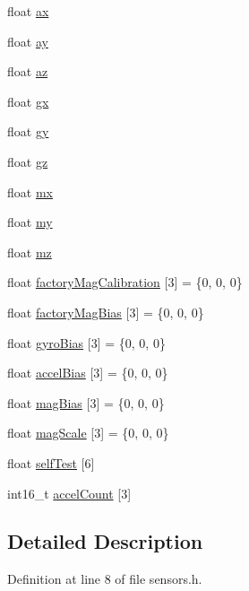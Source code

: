 \begin{DoxyCompactItemize}
float \hyperlink{classMPU9250_aea8a7622821bf8aca55fcef71d91e29f}{ax}
\item 
float \hyperlink{classMPU9250_a5129e95dbe12544fa34cc53b5644ff71}{ay}
\item 
float \hyperlink{classMPU9250_a8ab7a335476e40a26aba80f867ac7da9}{az}
\item 
float \hyperlink{classMPU9250_a59b6d7bd37738bac258da24ad330feef}{gx}
\item 
float \hyperlink{classMPU9250_a126311c382d2667b7bc7cbe1f9b38b51}{gy}
\item 
float \hyperlink{classMPU9250_a756658ca06a3807ef426ab87022a15c9}{gz}
\item 
float \hyperlink{classMPU9250_aa4cc8b2c9417304d1106bdbd988ac607}{mx}
\item 
float \hyperlink{classMPU9250_ad7cf9fe3134d24f46705881b2e002f31}{my}
\item 
float \hyperlink{classMPU9250_af11072922aa71ffb125fe3786f848653}{mz}
\item 
float \hyperlink{classMPU9250_a30d462461868e4f306c2f47d1adbd1d2}{factory\+Mag\+Calibration} \mbox{[}3\mbox{]} = \{0, 0, 0\}
\item 
float \hyperlink{classMPU9250_af34938d098b83ec910bee1b51a41972f}{factory\+Mag\+Bias} \mbox{[}3\mbox{]} = \{0, 0, 0\}
\item 
float \hyperlink{classMPU9250_a4fc2232b3fdbd61bc1024c86842ddf9a}{gyro\+Bias} \mbox{[}3\mbox{]} = \{0, 0, 0\}
\item 
float \hyperlink{classMPU9250_a7b0e6389baccd5592c95cae9d24d1317}{accel\+Bias} \mbox{[}3\mbox{]} = \{0, 0, 0\}
\item 
float \hyperlink{classMPU9250_a1f3b364d6efca22837dd944c60effce5}{mag\+Bias} \mbox{[}3\mbox{]} = \{0, 0, 0\}
\item 
float \hyperlink{classMPU9250_a09f641aa48a5c7228a6ea5034e0391c3}{mag\+Scale} \mbox{[}3\mbox{]} = \{0, 0, 0\}
\item 
float \hyperlink{classMPU9250_afd15093e18fc34ce15e526f464fc557a}{self\+Test} \mbox{[}6\mbox{]}
\item 
int16\+\_\+t \hyperlink{classMPU9250_adb56df6ceaf1dc204f97270540ac8b14}{accel\+Count} \mbox{[}3\mbox{]}
\end{DoxyCompactItemize}


\subsection{Detailed Description}


Definition at line 8 of file sensors.\+h.



